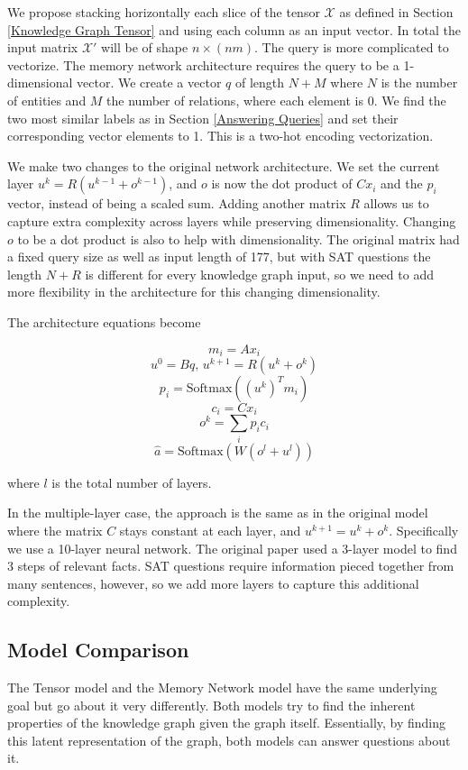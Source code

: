 \documentclass[pageno]{final_paper}
\begin{document}
We propose stacking horizontally each slice of the tensor $\mathcal{X}$ as
defined in Section \ref{Knowledge Graph Tensor} and using each column as an input
vector. In total the input matrix $\mathcal{X}'$ will be of shape $n\times
(nm)$. The query is more complicated to vectorize. The memory network
architecture requires the query to be a 1-dimensional vector. We create a vector
$q$ of length $N+M$ where $N$ is the number of entities and $M$ the number of
relations, where each element is 0. We find the two most similar labels as in
Section \ref{Answering Queries} and set their corresponding vector elements to
1. This is a two-hot encoding vectorization.

We make two changes to the original network architecture. We set the current
layer $u^k = R(u^{k-1} + o^{k-1})$, and $o$ is now the dot product of $Cx_i$ and
the $p_i$ vector, instead of being a scaled sum. Adding another matrix $R$
allows us to capture extra complexity across layers while preserving
dimensionality. Changing $o$ to be a dot product is also to help with
dimensionality. The original matrix had a fixed query size as well as input
length of 177, but with SAT questions the length $N+R$ is different for every
knowledge graph input, so we need to add more flexibility in the architecture
for this changing dimensionality.

The architecture equations become

$$m_i = Ax_i$$
$$u^0 = Bq,\, u^{k+1} = R(u^k + o^k)$$
$$p_i = \text{Softmax}\left(\left(u^k\right)^Tm_i\right)$$
$$c_i = Cx_i$$
$$o^k = \sum_i p_ic_i$$
$$\hat{a} = \text{Softmax}\left(W\left(o^l+u^l\right)\right)$$

where $l$ is the total number of layers.

In the multiple-layer case, the approach is the same as in the original model
where the matrix $C$ stays constant at each layer, and $u^{k+1} = u^k + o^k$.
Specifically we use a 10-layer neural network. The original paper used a 3-layer
model to find 3 steps of relevant facts. SAT questions require information
pieced together from many sentences, however, so we add more layers to capture
this additional complexity.

\subsection{Model Comparison}
\label{Model Comparison}

The Tensor model and the Memory Network model have the same underlying goal but
go about it very differently. Both models try to find the inherent properties
of the knowledge graph given the graph itself. Essentially, by finding this
latent representation of the graph, both models can answer questions about it.
\end{document}

